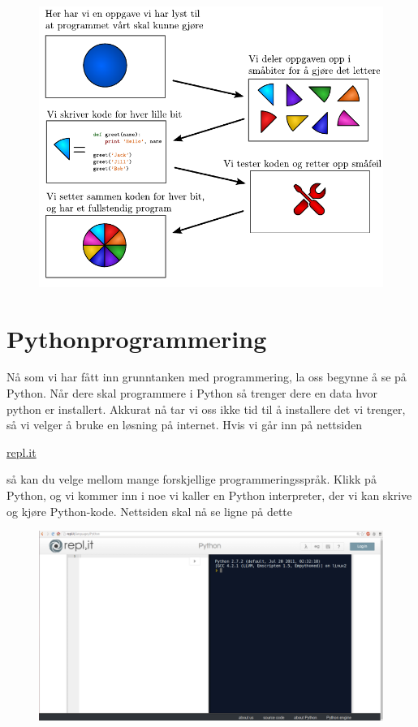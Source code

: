 \documentclass[a4paper, 11pt, notitlepage]{article}
\begin{document}
\begin{figure}[!h]
\centering
\includegraphics{programmering}
\end{figure}

\clearpage

\section*{Pythonprogrammering}

Nå som vi har fått inn grunntanken med programmering, la oss begynne å se på Python. Når dere skal programmere i Python så trenger dere en data hvor python er installert. Akkurat nå tar vi oss ikke tid til å installere det vi trenger, så vi velger å bruke en løsning på internet. Hvis vi går inn på nettsiden

\url{repl.it}

så kan du velge mellom mange forskjellige programmeringsspråk. Klikk på Python, og vi kommer inn i noe vi kaller en Python interpreter, der vi kan skrive og kjøre Python-kode. Nettsiden skal nå se ligne på dette
\begin{figure}[htpb]
	\centering
	\includegraphics[width=\textwidth]{6hjBfs2}
\end{figure}
\end{document}
